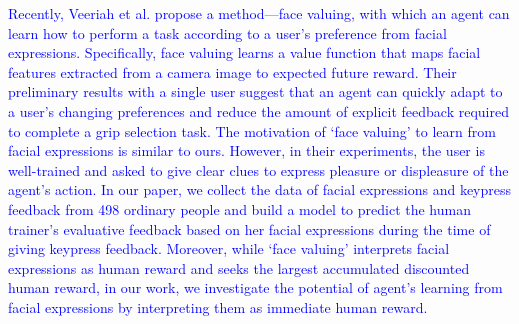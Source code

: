 \textcolor{blue}{Recently, Veeriah et al. \cite{veeriah2016face} propose a method---face valuing, with which an agent can learn how to perform a task according to a user's preference from facial expressions. Specifically, face valuing learns a value function that maps facial features extracted from a camera image to expected future reward. %
Their preliminary results with a single user suggest that an agent can quickly adapt to a user's changing preferences %
and reduce the amount of explicit feedback required to complete a grip selection task. 
The motivation of `face valuing' to learn from facial expressions is similar to ours. However, in their experiments, the user is well-trained and asked to give clear clues to express pleasure or displeasure of the agent's action. In our paper, we collect the data of facial expressions and keypress feedback from 498 ordinary people and build a model to predict the human trainer's evaluative feedback based on her facial expressions during the time of giving keypress feedback. Moreover, while `face valuing' interprets facial expressions as human reward and seeks the largest accumulated discounted human reward, in our work, we investigate the potential of agent's learning from facial expressions by interpreting them as immediate human reward. %
}

